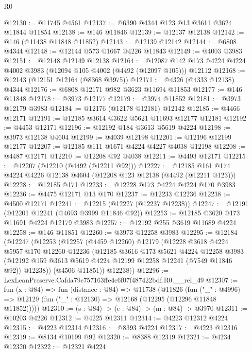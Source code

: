 \begin{lexlean}{R0}
\begin{coremodule}
@12130 := @11745 @4561
@12137 := @6390 @4344 @123 @13 @3611 @3624 @11844 @11854
@12138 := @146 @11846
@12139 := @12137 @12138
@12142 := @146 (@11438 @11848 @11852)
@12143 := @12139 @12142
@12144 := @6808 @4344
@12148 := @12144 @573 @1667 @4226 @11843
@12149 := @4003 @3983
@12151 := @12148 @12149 @12138
@12164 := @12087 @142 @173 @4224 @4224 @4002 @3983 (@12094 @105 @4002 (@4492 (@12097 @105))) @12112
@12168 := @12143 (@12151 @12164 (@8368 @3975))
@12171 := @4326 (@4333 @12138) @4344
@12176 := @6808 @12171 @982 @3623 @11694 @11853
@12177 := @146 @11848
@12178 := @3973 @12177
@12179 := @3974 @11852
@12181 := @3973 @12179 @3983
@12184 := @12176 (@12178 @12181) @12142
@12185 := @4466 @12171
@12191 := @12185 @3614 @3622 @5621 @11693 @12177 @12181
@12192 := @4453 @12171
@12196 := @12192 @184 @3613 @5619 @4224
@12198 := @3973 @12138 @4604
@12199 := @4039 @12198
@12201 := @12196 @12199 @12177
@12207 := @12185 @111 @1671 @4224 @4227 @4038 @12198
@12208 := @4487 @12171
@12210 := @12208 @92 @4038
@12211 := @4493 @12171
@12215 := @12207 (@12210 (@4492 (@12211 @92)))
@12227 := @12185 @161 @174 @4224 @4226 @12138 @4604 (@12208 @123 @12138 (@4492 (@12211 @123)))
@12228 := @12185 @171
@12233 := @12228 @173 @4224 @4224 @170 @3983
@12236 := @4475 @12171 @13 @170
@12237 := @12233 @12236
@12238 := @4500 @12171
@12241 := @12215 (@12227 (@12237 @12238))
@12247 := @12191 (@12201 @12241 (@4693 @3999 @11846 @92))
@12253 := @12185 @3620 @173 @11691 @4224 @12179 @3983
@12257 := @12192 @255 @3619 @11689 @4224
@12258 := @146 @11851
@12260 := @3973 @12258 @3983
@12295 := @12184
    (@12247
      (@12253
        (@12257
          (@4459 @12260)
          @12179
          (@12228
            @3618
            @4224
            @5957
            @170
            @12260
            @12236
            (@12185
              @3616
              @173
              @5621
              @4224
              @12258
              @3983
              (@12192 @159 @3613 @5619 @4224 @12199 @12258 @12241 (@7549 @11846 @92))
              @12238))
          (@4506 @11851))
        @12238))
@12296 := LexLeanPreserve.Cafda79c757163ffe4c6f07f487422bdf.R0.__rel_49
@12307 := fun (x : @84) =>
  fun (distance : @84) =>
  @11738
    (@11826
      (fun ("_" : @4996) => @12129 (fun ("_" : @12130) => @12168 (@12295 (@12296 @11848 @11852)))))
@12310 := (s : @84) -> (e : @84) -> (m : @84) -> @3970
@12311 := @10203 @4226
@12312 := @4225 @12311
@12314 := @4223 @12312 @4224
@12315 := @4223 @12314
@12316 := @8393 @4224
@12317 := @4223 @12316
@12319 := @8134 @10199 @92
@12320 := @8388 @12319
@12321 := @4234 @12320
@12322 := @12321 @4224

\end{coremodule}
\end{lexlean}
